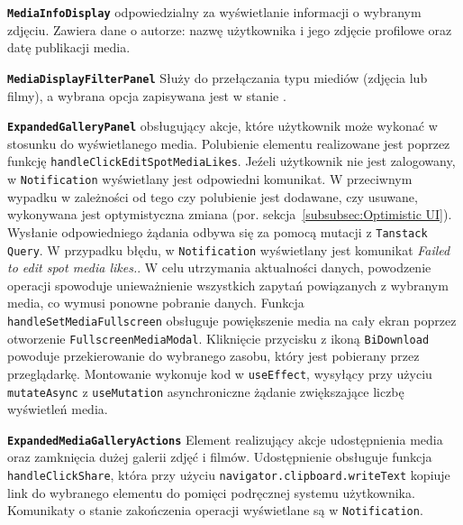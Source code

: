 \textbf{\texttt{MediaInfoDisplay}}
 odpowiedzialny za wyświetlanie informacji o wybranym zdjęciu.
Zawiera dane o autorze: nazwę użytkownika i jego zdjęcie profilowe oraz datę publikacji media.

\textbf{\texttt{MediaDisplayFilterPanel}}
Służy do przełączania typu miediów (zdjęcia lub filmy), a wybrana opcja zapisywana jest
w stanie .

\textbf{\texttt{ExpandedGalleryPanel}}
 obsługujący akcje, które użytkownik może wykonać w stosunku do wyświetlanego
media.
Polubienie elementu realizowane jest poprzez funkcję \newline \texttt{handleClickEditSpotMediaLikes}.
Jeźeli użytkownik nie jest zalogowany, w \texttt{Notification} wyświetlany jest odpowiedni komunikat.
W przeciwnym wypadku w zależności od tego czy polubienie jest dodawane, czy usuwane, wykonywana jest
optymistyczna zmiana  (por. sekcja~\ref{subsubsec:Optimistic UI}).
Wysłanie odpowiedniego żądania odbywa się za pomocą mutacji z 
\texttt{Tanstack Query}.
W przypadku błędu, w  \newline \texttt{Notification} wyświetlany jest komunikat
\emph{Failed to edit spot media likes.}.
W celu utrzymania aktualności danych, powodzenie operacji spowoduje unieważnienie wszystkich zapytań
powiązanych z wybranym media, co wymusi ponowne pobranie danych.
Funkcja \texttt{handleSetMediaFullscreen} obsługuje powiększenie media na cały ekran poprzez
otworzenie  \texttt{FullscreenMediaModal}.
Kliknięcie przycisku z ikoną \texttt{BiDownload} powoduje przekierowanie do wybranego zasobu, który
jest pobierany przez przeglądarkę.
Montowanie  wykonuje kod w \texttt{useEffect}, wysyłący
przy użyciu \texttt{mutateAsync} z  \texttt{useMutation} asynchroniczne
żądanie zwiększające liczbę wyświetleń media.

\textbf{\texttt{ExpandedMediaGalleryActions}}
Element realizujący akcje udostępnienia media oraz zamknięcia dużej galerii zdjęć i filmów.
Udostępnienie obsługuje funkcja \newline \texttt{handleClickShare}, która przy użyciu
\texttt{navigator.clipboard.writeText} kopiuje link do wybranego
elementu do pomięci podręcznej systemu użytkownika.
Komunikaty o stanie zakończenia operacji wyświetlane są w 
\texttt{Notification}.

